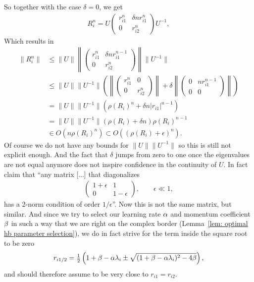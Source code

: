 So together with the case \(\delta=0\), we get
\begin{align*}
	R_i^n = U\begin{pmatrix}
		r_{i1}^n & \delta n r_{i1}^n\\
		0 & r_{i2}^n
	\end{pmatrix}U^{-1},
\end{align*}
Which results in
\begin{align*}
	\|R_i^n\|
	&\le \|U\|
	\left\| \begin{pmatrix}
		r_{i1}^n & \delta n r_{i1}^{n-1}\\
		0 & r_{i2}^n
	\end{pmatrix} \right\|
	\|U^{-1}\|\\
	&\le \|U\|\|U^{-1}\|
	\left(
	\left\| \begin{pmatrix}
		r_{i1}^n & 0\\
		0 & r_{i2}^n
	\end{pmatrix} \right\|
	+ \delta
	\left\| \begin{pmatrix}
		0 &  n r_{i1}^{n-1}\\
		0 & 0
	\end{pmatrix} \right\|
	\right)\\
	&= \|U\|\|U^{-1}\| (\rho(R_i)^n+ \delta n |r_{i1}|^{n-1})\\
	&= \|U\|\|U^{-1}\| (\rho(R_i)+ \delta n)\rho(R_i)^{n-1}\\
	&\in O(n\rho(R_i)^{n}) \subset O((\rho(R_i)+\epsilon)^n).
\end{align*}
%
Of course we do not have any bounds for \(\|U\|\|U^{-1}\|\) so this is still
not explicit enough. And the fact that \(\delta\) jumps from zero to one once the
eigenvalues are not equal anymore does not inspire confidence in the continuity
of \(U\). In fact \textcite[Section 7.1.5]{golubMatrixComputations2013} claim
that ``any matrix [...] that diagonalizes
\begin{align*}
	\begin{pmatrix}
		1+\epsilon & 1 \\
		0 & 1-\epsilon
	\end{pmatrix},
	\qquad \epsilon \ll 1,
\end{align*}
has a 2-norm condition of order \(1/\epsilon\)''. Now this is not the same matrix,
but similar. And since we try to select our learning rate \(\alpha\) and momentum
coefficient \(\beta\) in such a way that we are right on the complex border
(Lemma~\ref{lem: optimal hb parameter selection}), we do in fact strive for the
term inside the square root to be zero
\begin{align*}
	r_{i1/2}
	= \tfrac12 \left(
		1+\beta-\alpha\lambda_i
		\pm \sqrt{(1+\beta-\alpha\lambda_i)^2 - 4\beta}
	\right),
\end{align*}
and should therefore assume to be very close to \(r_{i1}=r_{i2}\).

